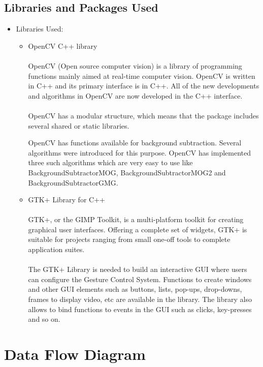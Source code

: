 \documentclass[11pt]{report}
\begin{document}
\section{Libraries and Packages Used}
\begin{itemize}
\item Libraries Used:
\begin{itemize}
    \item OpenCV C++ library
    \\
    \\OpenCV (Open source computer vision) is a library of programming functions mainly aimed at real-time computer vision. OpenCV is written in C++ and its primary interface is in C++. All of the new developments and algorithms in OpenCV are now developed in the C++ interface. 
    \\
    \\OpenCV has a modular structure, which means that the package includes several shared or static libraries.
    
    OpenCV has functions available for background subtraction. Several algorithms were introduced for this purpose. OpenCV has implemented three such algorithms which are very easy to use like BackgroundSubtractorMOG, BackgroundSubtractorMOG2 and BackgroundSubtractorGMG.
    
    \item GTK+ Library for C++
    \\
    \\GTK+, or the GIMP Toolkit, is a multi-platform toolkit for creating graphical user interfaces. Offering a complete set of widgets, GTK+ is suitable for projects ranging from small one-off tools to complete application suites.
    \\
    \\The GTK+ Library is needed to build an interactive GUI where users can configure the Gesture Control System. Functions to create windows and other GUI elements such as buttons, lists, pop-ups, drop-downs, frames to display video, etc are available in the library. The library also allows to bind functions to events in the GUI such as clicks, key-presses and so on.
    \\
    
\end{itemize}

\end{itemize}


\chapter{Data Flow Diagram}
\end{document}
